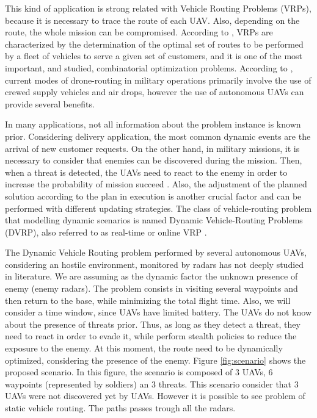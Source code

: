 This kind of application is strong related with Vehicle Routing Problems (VRPs), because it is necessary to trace the route of each UAV. Also, depending on the  route, the whole mission can be compromised. According to \cite{toth_2002}, VRPs are characterized by the determination of the optimal set of routes to be performed by a fleet of vehicles to serve a given set of customers, and it is one of the most important, and studied, combinatorial optimization problems. According to \cite{thornton_2018}, current modes of drone-routing in military operations primarily involve the use of crewed supply vehicles and air drops, however the use of autonomous UAVs can provide several benefits.

In many applications, not all information about the problem instance is known prior. Considering delivery application, the most common dynamic events are the arrival of new customer requests. On the other hand, in military missions, it is necessary to consider that enemies can be discovered during the mission. Then, when a threat is detected, the UAVs need to react to the enemy in order to increase the probability of mission succeed  \cite{zhou_2018}. Also, the adjustment of the planned solution according to the plan in execution is another crucial factor and can be performed with different updating strategies. The class of vehicle-routing problem that modelling dynamic scenarios is named Dynamic Vehicle-Routing Problems (DVRP), also referred to as real-time or online VRP \cite{ritzinger_2016}. 

The Dynamic Vehicle Routing problem performed by several autonomous UAVs, considering an hostile environment, monitored by radars has not deeply studied in literature. We are assuming as the dynamic factor the unknown presence of enemy (enemy radars). The problem consists in visiting several waypoints and then return to the base, while minimizing the total flight time. Also, we will consider a time window, since UAVs have limited battery. The UAVs do not know about the presence of threats prior. Thus, as long as they detect a threat, they need to react in order to evade it, while perform stealth policies to reduce the exposure to the enemy. At this moment, the route need to be dynamically optimized, considering the presence of the enemy.  Figure \ref{fig:scenario} shows the proposed scenario. In this figure, the scenario is composed of 3 UAVs, 6 waypoints (represented by soldiers) an 3 threats. This scenario consider that 3 UAVs were not discovered yet by UAVs. However it is possible to see problem of static vehicle routing. The paths passes trough all the radars.

